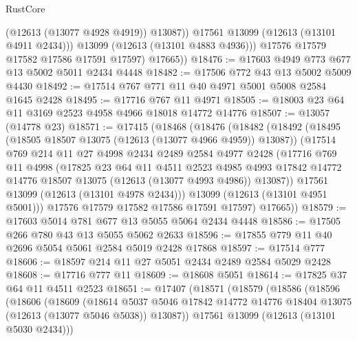 \begin{lexlean}{RustCore}
\begin{coremodule}
                  (@12613 (@13077 @4928 @4919))
                  @13087))
              @17561
              @13099
              (@12613 (@13101 @4911 @2434)))
            @13099
            (@12613 (@13101 @4883 @4936)))
          @17576
          @17579
          @17582
          @17586
          @17591
          @17597)
        @17665))
@18476 := @17603 @4949 @773 @677 @13 @5002 @5011 @2434 @4448
@18482 := @17506 @772 @43 @13 @5002 @5009 @4430
@18492 := @17514 @767 @771 @11 @40 @4971 @5001 @5008 @2584 @1645 @2428
@18495 := @17716 @767 @11 @4971
@18505 := @18003 @23 @64 @11 @3169 @2523 @4958 @4966 @18018 @14772 @14776
@18507 := @13057 (@14778 @23)
@18571 := @17415
    (@18468
      (@18476
        (@18482
          (@18492
            (@18495 (@18505 @18507 @13075 (@12613 (@13077 @4966 @4959)) @13087))
            (@17514
              @769
              @214
              @11
              @27
              @4998
              @2434
              @2489
              @2584
              @4977
              @2428
              (@17716
                @769
                @11
                @4998
                (@17825
                  @23
                  @64
                  @11
                  @4511
                  @2523
                  @4985
                  @4993
                  @17842
                  @14772
                  @14776
                  @18507
                  @13075
                  (@12613 (@13077 @4993 @4986))
                  @13087))
              @17561
              @13099
              (@12613 (@13101 @4978 @2434)))
            @13099
            (@12613 (@13101 @4951 @5001)))
          @17576
          @17579
          @17582
          @17586
          @17591
          @17597)
        @17665))
@18579 := @17603 @5014 @781 @677 @13 @5055 @5064 @2434 @4448
@18586 := @17505 @266 @780 @43 @13 @5055 @5062 @2633
@18596 := @17855 @779 @11 @40 @2696 @5054 @5061 @2584 @5019 @2428 @17868
@18597 := @17514 @777
@18606 := @18597 @214 @11 @27 @5051 @2434 @2489 @2584 @5029 @2428
@18608 := @17716 @777 @11
@18609 := @18608 @5051
@18614 := @17825 @37 @64 @11 @4511 @2523
@18651 := @17407
    (@18571
      (@18579
        (@18586
          (@18596
            (@18606
              (@18609
                (@18614
                  @5037
                  @5046
                  @17842
                  @14772
                  @14776
                  @18404
                  @13075
                  (@12613 (@13077 @5046 @5038))
                  @13087))
              @17561
              @13099
              (@12613 (@13101 @5030 @2434)))

\end{coremodule}
\end{lexlean}
